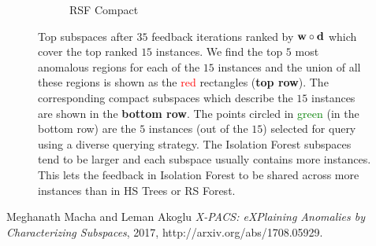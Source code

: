 \documentclass{article} %
\begin{document}
\begin{figure}
\begin{subfigure}[b]{0.3\textwidth}
    	\caption{RSF Compact}
    	\label{fig:rsforest_compact_rects}
    \end{subfigure}
	\caption{Top subspaces after $35$ feedback iterations ranked by ${\bf w}\circ{\bf d}$ which cover the top ranked $15$ instances. We find the top $5$ most anomalous regions for each of the $15$ instances and the union of all these regions is shown as the \textcolor{red}{red} rectangles (\textbf{top row}). The corresponding compact subspaces which describe the $15$ instances are shown in the \textbf{bottom row}. The points circled in \textcolor{green}{green} (in the bottom row) are the $5$ instances (out of the $15$) selected for query using a diverse querying strategy. The Isolation Forest subspaces tend to be larger and each subspace usually contains more instances. This lets the feedback in Isolation Forest to be shared across more instances than in HS Trees or RS Forest.} \label{fig:tree_diffs}
\end{figure}

\begin{thebibliography}{1}
 Meghanath Macha and Leman Akoglu {\em {X-PACS:} eXPlaining Anomalies by Characterizing Subspaces},  2017, http://arxiv.org/abs/1708.05929.
\end{thebibliography}
\end{document}
